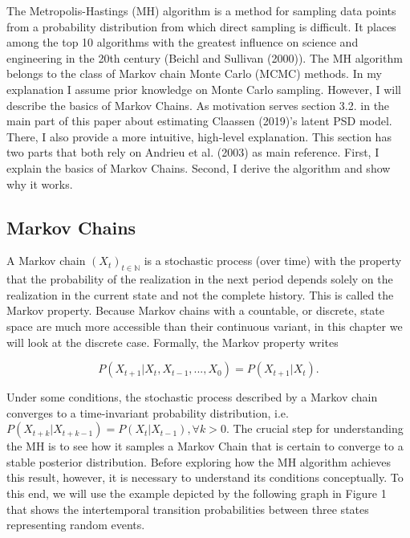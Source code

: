 \documentclass[12pt,english,a4paper,oneside]{article}
\theoremstyle{definition}
\theoremstyle{definition}
\theoremstyle{definition}
\theoremstyle{definition}
\theoremstyle{remark}
\begin{document}
The Metropolis-Hastings (MH) algorithm is a method for sampling data points from a probability distribution from which direct sampling is difficult. It places among the top 10 algorithms with the greatest influence on science and engineering in the 20th century (Beichl and Sullivan (2000)). The MH algorithm belongs to the class of Markov chain Monte Carlo (MCMC) methods. In my explanation I assume prior knowledge on Monte Carlo sampling. However, I will describe the basics of Markov Chains. As motivation serves section 3.2. in the main part of this paper about estimating Claassen (2019)'s latent PSD model. There, I also provide a more intuitive, high-level explanation. This section has two parts that both rely on Andrieu et al. (2003) as main reference. First, I explain the basics of Markov Chains. Second, I derive the algorithm and show why it works.

\hypertarget{markov-chains}{%
\subsection{Markov Chains}\label{markov-chains}}

A Markov chain \((X_t)_{t \in \mathbb{N}}\) is a stochastic process (over time) with the property that the probability of the realization in the next period depends solely on the realization in the current state and not the complete history. This is called the Markov property. Because Markov chains with a countable, or discrete, state space are much more accessible than their continuous variant, in this chapter we will look at the discrete case. Formally, the Markov property writes

\begin{equation}
\label{eq:markov-property}
P(X_{t+1} |X_{t}, X_{t-1}, ..., X_{0}) = P(X_{t+1} |X_{t}).
\end{equation}

\noindent
Under some conditions, the stochastic process described by a Markov chain converges to a time-invariant probability distribution, i.e.~\(P(X_{t+k} |X_{t+k-1}) = P(X_{t} |X_{t-1}), \forall k>0\). The crucial step for understanding the MH is to see how it samples a Markov Chain that is certain to converge to a stable posterior distribution. Before exploring how the MH algorithm achieves this result, however, it is necessary to understand its conditions conceptually. To this end, we will use the example depicted by the following graph in Figure 1 that shows the intertemporal transition probabilities between three states representing random events.
\end{document}
